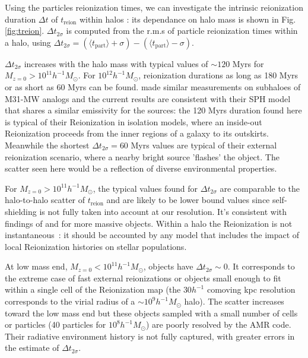 \documentclass[twocolumn]{aastex61}
\begin{document}
%

Using the particles reionization times, we can investigate the intrinsic reionization duration $\Delta t$ of $t_\mathrm{reion}$ within halos : its dependance on halo mass is shown in Fig. \ref{fig:treion}. $\Delta t_{2\sigma}$ is computed from the r.m.s of particle reionization times within a halo, using $\Delta t_{2\sigma}=(\langle t_\mathrm{part}\rangle+\sigma)-(\langle t_\mathrm{part}\rangle-\sigma)$. 

$\Delta t_{2\sigma}$ increases with the halo mass with typical values of $\sim 120$ Myrs for $M_{z=0}>10^{11} h^{-1} M_\odot$. For $10^{12} h^{-1} M_\odot$, reionization durations as long as 180 Myrs or as short as 60 Myrs can be found. \citet{OCV14} made similar measurements on subhaloes of M31-MW analogs and the current results are consistent with their SPH model that shares a similar emissivity for the sources: the 120 Myrs duration found here is typical of their Reionization in isolation models, where an inside-out Reionization proceeds from the inner regions of a galaxy to its outskirts. Meanwhile the shortest $\Delta t_{2\sigma}=60$ Myrs values are typical of their external reionization scenario, where a nearby bright source 'flashes' the object. The scatter seen here would be a reflection of diverse environmental properties.

For $M_{z=0}>10^{11}h^{-1} M_\odot$, the typical values found for $\Delta t_{2\sigma}$ are comparable to the halo-to-halo scatter of $t_\mathrm{reion}$ and are likely to be lower bound values since self-shielding is not fully taken into account at our resolution. It's consistent with findings of \citet{ALV9} and \citet{LI14} for more massive objects. Within a halo the Reionization is not instantaneous~: it should be accounted by any model that includes the impact of local Reionization histories on stellar populations. 

At low mass end, $M_{z=0}<10^{11}h^{-1} M_\odot$, objects have $\Delta t_{2\sigma}\sim 0$. It corresponds to the extreme case of fast external reionizations or objects small enough to fit within a single cell of the Reionization map (the $30 h^{-1}$ comoving kpc resolution corresponds to the virial radius of a $\sim 10^9 h^{-1} M_\odot$ halo). The scatter increases toward the low mass end but these objects sampled with a small number of cells or particles (40 particles for $10^8 h^{-1} M_\odot$) are poorly resolved by the AMR code. Their radiative environment history is not fully captured, with greater errors in the estimate of $\Delta t_{2\sigma}$.
\end{document}
